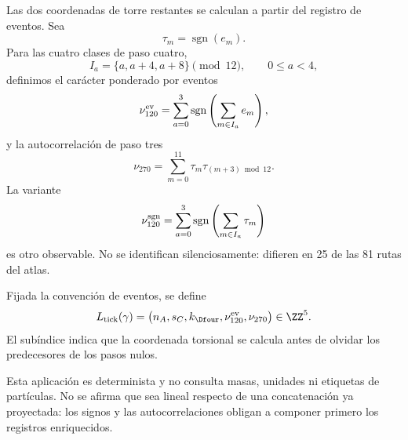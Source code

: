 Las dos coordenadas de torre restantes se calculan a partir del registro de
eventos. Sea
\[
 \tau_m=\operatorname{sgn}(e_m).
\]
Para las cuatro clases de paso cuatro,
\[
 I_a=\{a,a+4,a+8\}\pmod{12},
 \qquad 0\leq a<4,
\]
definimos el carácter ponderado por eventos
\[
 \nu_{120}^{\rm ev}
 =\sum_{a=0}^{3}\operatorname{sgn}
 \left(\sum_{m\in I_a}e_m\right),
\]
y la autocorrelación de paso tres
\[
 \nu_{270}=\sum_{m=0}^{11}\tau_m\tau_{(m+3)\bmod12}.
\]
La variante
\[
 \nu_{120}^{\rm sgn}
 =\sum_{a=0}^{3}\operatorname{sgn}
 \left(\sum_{m\in I_a}\tau_m\right)
\]
es otro observable. No se identifican silenciosamente: difieren en
25 de las 81 rutas del atlas.

\begin{definition}
Fijada la convención de eventos, se define
\[
 L_{\rm tick}(\gamma)=
 \bigl(n_A,s_C,k_{\Dfour},\nu_{120}^{\rm ev},\nu_{270}\bigr)
 \in\ZZ^5.
\]
El subíndice indica que la coordenada torsional se calcula antes de olvidar
los predecesores de los pasos nulos.
\end{definition}

Esta aplicación es determinista y no consulta masas, unidades ni etiquetas
de partículas. No se afirma que sea lineal respecto de una concatenación ya
proyectada: los signos y las autocorrelaciones obligan a componer primero los
registros enriquecidos.

